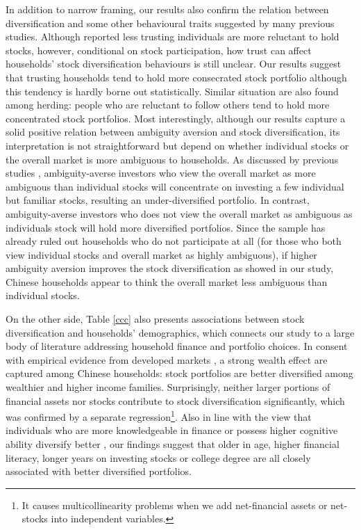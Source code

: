 \documentclass[ukenglish,nottitlepage,thmsb,11pt,letterpaper]{article}
\begin{document}
In addition to narrow framing, our results also confirm the relation between diversification and some other behavioural traits suggested by many previous studies. Although \citet{Guiso2008} reported less trusting individuals are more reluctant to hold stocks, however, conditional on stock participation, how trust can affect households' stock diversification behaviours is still unclear. Our results suggest that trusting households tend to hold more consecrated stock portfolio  although this tendency is hardly borne out statistically. Similar situation are also found among herding: people who are reluctant to follow others tend to hold more concentrated stock portfolios.  Most interestingly, although our results capture a solid positive relation between ambiguity aversion and stock diversification, its interpretation is not straightforward but depend on whether individual stocks or the overall market is more ambiguous to households. As discussed by previous studies \citep[e.g., ][]{Boyle2012,Dimmock2016},  ambiguity-averse investors who view the overall market as more ambiguous than individual stocks will concentrate on investing a few individual but familiar stocks, resulting an under-diversified portfolio. In contrast,  ambiguity-averse investors who does not view the overall market as ambiguous as individuals stock will hold more diversified portfolios. Since the sample has already ruled out households who do not participate at all (for those who both view individual stocks and overall market as highly ambiguous), if higher ambiguity aversion improves the stock diversification as showed in our study, Chinese households appear to think the overall market less ambiguous than individual stocks. 

On the other side, Table \ref{ccc}  also presents associations between stock diversification and households' demographics, which connects our study to a large body of literature addressing household finance and portfolio choices. In consent with empirical evidence from developed markets \citep[e.g., ][]{Vissing-Jorgensen2002,Vissing-Jorgensen2003,Campbell2006,Goetzmann2008,Fuertes2014}, a strong wealth effect are captured among Chinese households: stock portfolios are better diversified among wealthier and higher income families. Surprisingly, neither larger portions of financial assets nor stocks  contribute to stock diversification significantly, which was confirmed by a separate regression\footnote{It causes multicollinearity problems when we add net-financial assets or net-stocks into independent variables. }.  Also in line with the view that individuals who are more knowledgeable in finance or possess higher cognitive ability diversify better \citep[e.g., see][]{Dorn2009,Fuertes2014,Gaudecker2015}, our findings suggest that older in age, higher financial literacy, longer years on investing stocks or college degree are all closely associated with better diversified portfolios.
\end{document}
